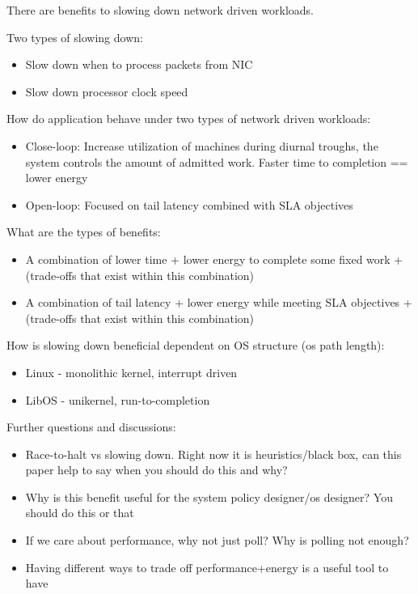 \label{sec:intro}
There are benefits to slowing down network driven workloads.

Two types of slowing down:
\begin{itemize}
    \item Slow down when to process packets from NIC
    \item Slow down processor clock speed
\end{itemize}

How do application behave under two types of network driven workloads:
\begin{itemize}
    \item Close-loop: Increase utilization of machines during diurnal troughs, the system controls the amount of admitted work. Faster time to completion == lower energy
    \item Open-loop: Focused on tail latency combined with SLA objectives
\end{itemize}

What are the types of benefits:
\begin{itemize}
    \item A combination of lower time + lower energy to complete some fixed work + (trade-offs that exist within this combination)
    \item A combination of tail latency + lower energy while meeting SLA objectives + (trade-offs that exist within this combination)
\end{itemize}

How is slowing down beneficial dependent on OS structure (os path length):
\begin{itemize}
    \item Linux - monolithic kernel, interrupt driven
    \item LibOS - unikernel, run-to-completion
\end{itemize}

Further questions and discussions:
\begin{itemize}
    \item Race-to-halt vs slowing down. Right now it is heuristics/black box, can this paper help to say when you should do this and why?
    \item Why is this benefit useful for the system policy designer/os designer? You should do this or that
    \item If we care about performance, why not just poll? Why is polling not enough?
    \item Having different ways to trade off performance+energy is a useful tool to have
\end{itemize}

